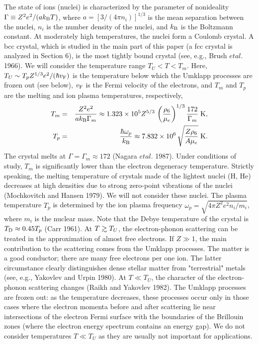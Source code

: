 The state of ions (nuclei) is characterized by the parameter of
nonideality $\Gamma \equiv Z^2 e^2/(a \mbox{$k_{\rm B}$} T)$, where 
$a = [3/(4 \pi n_i)]^{1/3}$ is the mean separation between the
nuclei, $n_i$ is the number density of the nuclei, and $\mbox{$k_{\rm B}$}$ is the
Boltzmann constant. At moderately high temperatures, the nuclei
form a Coulomb crystal. A bcc crystal, which is studied in the
main part of this paper (a fcc crystal is analyzed in Section
6), is the most tightly bound crystal (see, e.g., Brush $et al.$
1966). We will consider the temperature range $T_U< T < T_m$.
Here, $T_U \sim T_p Z^{1/3} e^2/(\hbar \mbox{$v_{\rm F}$})$ 
is the temperature below which the Umklapp processes are frozen out
(see below), $\mbox{$v_{\rm F}$}$ is the Fermi velocity of the electrons,
and $T_m$ and $T_p$ are the melting and ion plasma temperatures,
respectively,
%
\begin{eqnarray}
       T_m & = & {Z^2e^2 \over a \mbox{$k_{\rm B}$} \Gamma_m} \approx
               1.323 \times 10^5 Z^{5/3} \,
               \left( {\rho_6 \over \mu_e} \right)^{1/3}
               {172 \over \Gamma_m} \; {\rm K},
      \label{eq:Tm} \\
       T_p &  = & {\hbar \omega_p \over \mbox{$k_{\rm B}$}} \approx
               7.832 \times 10^6 \,
               \sqrt{{Z \rho_6 \over A \mu_e}} \; {\rm K}.
\label{eq:Tp}
\end{eqnarray}
%
The crystal melts at $\Gamma = \Gamma_m \approx 172$ 
(Nagara $et al.$ 1987). Under conditions of study,
$T_m$ is significantly lower than the electron degeneracy temperature.
Strictly speaking, the melting temperature of crystals made
of the lightest nuclei (H, He) decreases at high densities due to strong
zero-point vibrations of the nuclei (Mochkovitch and Hansen 1979).
We will not consider these nuclei.
The plasma temperature $T_p$ is determined by the ion plasma
frequency $\omega_p = \sqrt{4 \pi Z^2 e^2 n_i/m_i}$, where 
$m_i$ is the nuclear mass. Note that the Debye temperature of
the crystal is $T_{\rm D} \approx 0.45 T_p$ (Carr 1961). 
At $T \ga T_U$, the electron-phonon scattering can be treated in the
approximation of almost free electrons. If $Z \gg 1$, the main
contribution to the scattering comes from the Umklapp processes.
The matter is a good conductor; there are many free electrons per one ion.
The latter circumstance clearly distinguishes dense
stellar matter from "terrestrial" metals (see, e.g., Yakovlev and
Urpin 1980). At $T \ll T_U$, the character of the electron-phonon
scattering changes (Raikh and Yakovlev 1982). The Umklapp processes
are frozen out: as the temperature decreases,
these processes occur only
in those cases where the electron momenta before and after
scattering lie near intersections of the electron Fermi
surface with the boundaries of the Brillouin zones
(where the electron energy spectrum contains an energy gap).
We do not consider temperatures $T \ll T_U$ as they are usually not important
for applications.

